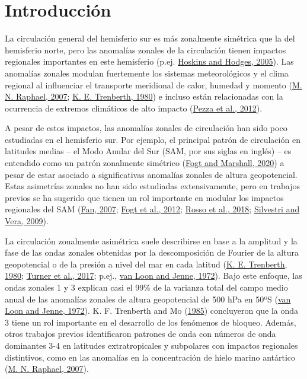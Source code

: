 \documentclass[12pt,oneside,a4paper]{reedthesis}
\begin{document}
  \listoftables

  \listoffigures


\mainmatter %
\pagestyle{fancyplain} %

\hypertarget{intro}{%
\chapter{Introducción}\label{intro}}

La circulación general del hemisferio sur es más zonalmente simétrica que la del hemisferio norte, pero las anomalías zonales de la circulación tienen impactos regionales importantes en este hemisferio (p.ej. \protect\hyperlink{ref-hoskins2005}{Hoskins and Hodges, 2005}).
Las anomalías zonales modulan fuertemente los sistemas meteorológicos y el clima regional al influenciar el transporte meridional de calor, humedad y momento (\protect\hyperlink{ref-raphael2007}{M. N. Raphael, 2007}; \protect\hyperlink{ref-trenberth1980a}{K. E. Trenberth, 1980}) e incluso están relacionadas con la ocurrencia de extremos climáticos de alto impacto (\protect\hyperlink{ref-pezza2012}{Pezza et al., 2012}).

A pesar de estos impactos, las anomalías zonales de circulación han sido poco estudiadas en el hemisferio sur.
Por ejemplo, el principal patrón de circulación en latitudes medias -- el Modo Anular del Sur (SAM, por sus siglas en inglés) -- es entendido como un patrón zonalmente simétrico (\protect\hyperlink{ref-fogt2020}{Fogt and Marshall, 2020}) a pesar de estar asociado a significativas anomalías zonales de altura geopotencial.
Estas asimetrías zonales no han sido estudiadas extensivamente, pero en trabajos previos se ha sugerido que tienen un rol importante en modular los impactos regionales del SAM (\protect\hyperlink{ref-fan2007}{Fan, 2007}; \protect\hyperlink{ref-fogt2012}{Fogt et al., 2012}; \protect\hyperlink{ref-rosso2018}{Rosso et al., 2018}; \protect\hyperlink{ref-silvestri2009}{Silvestri and Vera, 2009}).

La circulación zonalmente asimétrica suele describirse en base a la amplitud y la fase de las ondas zonales obtenidas por la descomposición de Fourier de la altura geopotencial o de la presión a nivel del mar en cada latitud (\protect\hyperlink{ref-trenberth1980a}{K. E. Trenberth, 1980}; \protect\hyperlink{ref-turner2017}{Turner et al., 2017}; p.ej., \protect\hyperlink{ref-vanloon1972}{van Loon and Jenne, 1972}).
Bajo este enfoque, las ondas zonales 1 y 3 explican casi el 99\% de la varianza total del campo medio anual de las anomalías zonales de altura geopotencial de 500 hPa en 50ºS (\protect\hyperlink{ref-vanloon1972}{van Loon and Jenne, 1972}).
K. F. Trenberth and Mo (\protect\hyperlink{ref-trenberth1985}{1985}) concluyeron que la onda 3 tiene un rol importante en el desarrollo de los fenómenos de bloqueo.
Además, otros trabajos previos identificaron patrones de onda con números de onda dominantes 3-4 en latitudes extratropicales y subpolares con impactos regionales distintivos, como en las anomalías en la concentración de hielo marino antártico (\protect\hyperlink{ref-raphael2007}{M. N. Raphael, 2007}).
\end{document}
